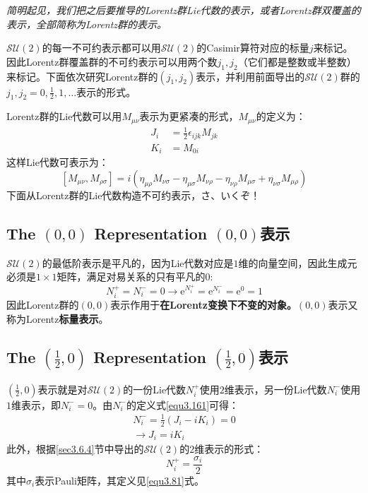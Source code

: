 {\it 简明起见，我们把之后要推导的Lorentz群Lie代数的表示，或者Lorentz群双覆盖的表示，全部简称为Lorentz群的表示。 }

$\mathcal{SU}(2)$的每一不可约表示都可以用$\mathcal{SU}(2)$的Casimir算符对应的标量$j$来标记。因此Lorentz群覆盖群的不可约表示可以用两个数$j_1, j_2$（它们都是整数或半整数）来标记。下面依次研究Lorentz群的$(j_1, j_2)$表示，并利用前面导出的$\mathcal{SU}(2)$群的$ j_1,j_2 = 0, \frac{1}{2}, 1, \dots$表示的形式。


Lorentz群的Lie代数可以用$M_{\mu \nu}$表示为更紧凑的形式，$M_{\mu \nu}$的定义为：
\begin{align}
\label{equ3.165}
	J_i &= \frac{1}{2} \epsilon_{ijk} M_{jk} \\
\label{equ3.166}
	K_i &= M_{0i}
\end{align}
这样Lie代数可表示为：
\begin{equation}
\label{equ3.167}
	[M_{\mu \nu}, M_{\rho \sigma}] = i(\eta_{\mu \rho} M_{\nu \sigma} - \eta_{\mu \sigma} M_{\nu \rho} - \eta_{\nu \rho} M_{\mu \sigma} + \eta_{\nu \sigma} M_{\mu \rho})
\end{equation}
下面从Lorentz群的Lie代数构造不可约表示，さ、いくぞ！

\subsection[$(0, 0)$表示]{The $(0, 0)$ Representation \quad $(0, 0)$表示}
\label{sec3.7.4}
$\mathcal{SU}(2)$的最低阶表示是平凡的，因为Lie代数对应是$1$维的向量空间，因此生成元必须是$1 \times 1$矩阵，满足对易关系的只有平凡的$0$:
\begin{equation}
\label{equ3.168}
	N_i^+ = N_i^- = 0 \rightarrow \mathrm{e}^{N_i^+} = \mathrm{e}^{N_i^-} = \mathrm{e}^0 = 1
\end{equation}
因此Lorentz群的$(0, 0)$表示作用于{\bf 在Lorentz变换下不变的对象。$(0, 0)$}表示又称为Lorentz{\bf 标量表示}。


\subsection[$(\frac{1}{2}, 0)$表示]{The $(\frac{1}{2}, 0)$ Representation \quad $(\frac{1}{2}, 0)$表示}
\label{sec3.7.5}
$(\frac{1}{2}, 0)$表示就是对$\mathcal{SU}(2)$的一份Lie代数$N_i^+$使用$2$维表示，另一份Lie代数$N_i^-$使用$1$维表示，即$N_i^- = 0$。由$N_i^-$的定义式\eqref{equ3.161}可得：
\begin{align}
\label{equ3.169}
	N_i^- = \frac{1}{2} (J_i - i K_i) = 0 \\
\label{equ3.170}
	\rightarrow J_i = i K_i
\end{align}
此外，根据\ref{sec3.6.4}节中导出的$\mathcal{SU}(2)$的$2$维表示的形式：
\begin{equation}
\label{equ3.171}
	N_i^+ = \frac{\sigma_i}{2}
\end{equation}
其中$\sigma_i$表示Pauli矩阵，其定义见\eqref{equ3.81}式。

